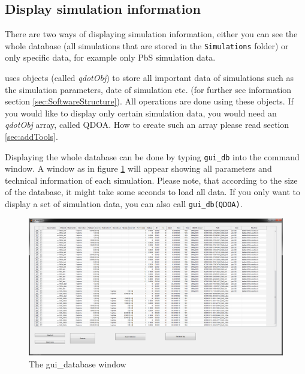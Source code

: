 		\subsection{Display simulation information} \label{sec:guiDB}
			There are two ways of displaying simulation information, either you can see the whole database  (all simulations
			that are stored in the \lstinline{Simulations} folder) or only specific data, for example only PbS simulation data.
			
			\begin{REMARK}
				\software uses objects (called {\it qdotObj}) to store all important data of simulations such as the simulation parameters, date of simulation etc.
				(for further see information section \ref{sec:SoftwareStructure}). All operations are done using these objects. If you would like to display only
				certain simulation data, you would need an {\it qdotObj} array, called \gls{QDOA}. How to create such an array please read section \ref{sec:addTools}.
			\end{REMARK}
			
			Displaying the whole database can be done by typing \lstinline{gui_db}  into the \matlab command window. A window as in figure
			\ref{fig:gui_database} will appear showing all parameters and technical information of each simulation. Please note, that according to the size
			of the database, it might take some seconds to load all data.
			If you only want to display a set of simulation data, you can also call \lstinline{gui_db(QDOA)}.
			
			\begin{figure}[htbp]
				\centering
				\includegraphics[width=\textwidth]{Fig/Scrn_gui_database.png}
				\caption{The gui\_database window}
				\label{fig:gui_database}
			\end{figure}
						
